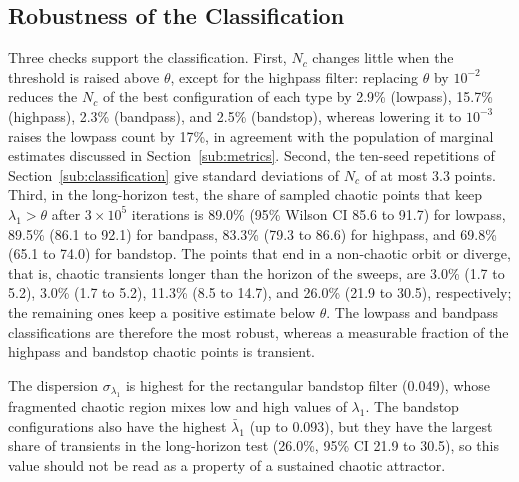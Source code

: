 \documentclass[journal]{IEEEtran}
\begin{document}
\subsection{Robustness of the Classification}\label{sub:ranking}

Three checks support the classification. First, $N_c$ changes little when the
threshold is raised above $\theta$, except for the highpass filter: replacing $\theta$ by $10^{-2}$ reduces the $N_c$ of
the best configuration of each type by 2.9\% (lowpass), 15.7\% (highpass),
2.3\% (bandpass), and 2.5\% (bandstop), whereas lowering it to $10^{-3}$ raises
the lowpass count by 17\%, in agreement with the population of marginal
estimates discussed in Section~\ref{sub:metrics}. Second, the ten-seed
repetitions of Section~\ref{sub:classification} give standard deviations of $N_c$ of at
most 3.3 points. Third, in the long-horizon test, the share of sampled chaotic
points that keep $\lambda_1>\theta$ after $3\times10^5$ iterations is 89.0\%
(95\% Wilson CI 85.6 to 91.7) for lowpass, 89.5\% (86.1 to 92.1) for bandpass,
83.3\% (79.3 to 86.6) for highpass, and 69.8\% (65.1 to 74.0) for bandstop.
The points that end in a non-chaotic orbit or diverge, that is, chaotic
transients longer than the horizon of the sweeps, are 3.0\% (1.7 to 5.2),
3.0\% (1.7 to 5.2), 11.3\% (8.5 to 14.7), and 26.0\% (21.9 to 30.5),
respectively; the remaining ones keep a positive estimate below $\theta$. The
lowpass and bandpass classifications are therefore the most robust, whereas a
measurable fraction of the highpass and bandstop chaotic points is transient.

The dispersion $\sigma_{\lambda_1}$ is highest for the rectangular bandstop
filter (0.049), whose fragmented chaotic region mixes low and high values of
$\lambda_1$. The bandstop configurations also have the highest $\bar{\lambda}_1$
(up to 0.093), but they have the largest share of transients in the
long-horizon test (26.0\%, 95\% CI 21.9 to 30.5), so this value should not be
read as a property of a sustained chaotic attractor.
\end{document}
